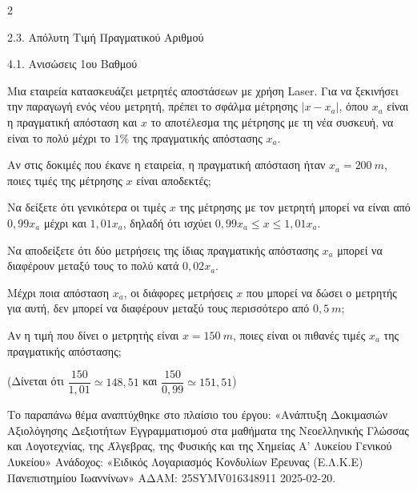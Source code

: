 \begin{ylh}{2}
    \item 2.3. Απόλυτη Τιμή Πραγματικού Αριθμού
    \item 4.1. Ανισώσεις 1ου Βαθμού
\end{ylh}
Μια εταιρεία κατασκευάζει μετρητές αποστάσεων με χρήση Laser. Για να ξεκινήσει την παραγωγή ενός νέου μετρητή, πρέπει το σφάλμα μέτρησης $\left| x - x_{a} \right|$, όπου $x_{a}$ είναι η πραγματική απόσταση και $x$ το αποτέλεσμα της μέτρησης με τη νέα συσκευή, να είναι το πολύ μέχρι το $1\%$ της πραγματικής απόστασης $x_{a}$.

\begin{alist}
\item Αν στις δοκιμές που έκανε η εταιρεία, η πραγματική απόσταση ήταν $x_{a} = 200\ m$, ποιες τιμές της μέτρησης $x$ είναι αποδεκτές;
\item
\begin{rlist}
\item
  Να δείξετε ότι γενικότερα οι τιμές $x$ της μέτρησης με τον μετρητή μπορεί να είναι από $0,99x_{a}$ μέχρι και $1,01x_{a}$, δηλαδή ότι ισχύει $0,99x_{a} \leq x \leq 1,01x_{a}$.
\item
  Να αποδείξετε ότι δύο μετρήσεις της ίδιας πραγματικής απόστασης $x_{a}$ μπορεί να διαφέρουν μεταξύ τους το πολύ κατά $0,02x_{a}$.
\item
  Μέχρι ποια απόσταση $x_{a}$, οι διάφορες μετρήσεις $x$ που μπορεί να δώσει ο μετρητής για αυτή, δεν μπορεί να διαφέρουν μεταξύ τους περισσότερο από $0,5\ m$;
\end{rlist}
\item Αν η τιμή που δίνει ο μετρητής είναι $x = 150\ m$, ποιες είναι οι πιθανές τιμές $x_{a}$ της πραγματικής απόστασης;

(Δίνεται ότι $\dfrac{150}{1,01} \simeq 148,51$ και $\dfrac{150}{0,99} \simeq 151,51$)

\end{alist}
{\footnotesize Το παραπάνω θέμα αναπτύχθηκε στο πλαίσιο του έργου: «Ανάπτυξη Δοκιμασιών Αξιολόγησης Δεξιοτήτων Εγγραμματισμού στα μαθήματα της Νεοελληνικής Γλώσσας και Λογοτεχνίας, της Άλγεβρας, της Φυσικής και της Χημείας Α' Λυκείου Γενικού Λυκείου» Ανάδοχος: «Ειδικός Λογαριασμός Κονδυλίων Έρευνας (Ε.Λ.Κ.Ε) Πανεπιστημίου Ιωαννίνων» ΑΔΑΜ: 25SYMV016348911 2025-02-20.}

